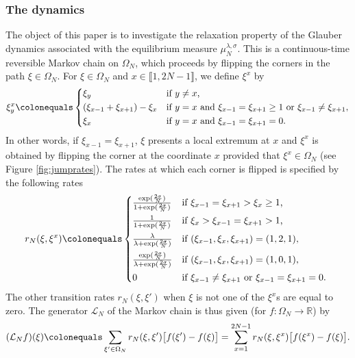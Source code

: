 \documentclass[reqno,11pt]{amsart}
\numberwithin{equation}{section}
\newcommand{\bbR}{{\ensuremath{\mathbb R}} }
\newcommand{\gO}{\Omega}
\newcommand{\lint}{\llbracket}
\newcommand{\rint}{\rrbracket}
\begin{document}
\subsubsection{The dynamics}
The object of this paper is to investigate the relaxation property of the Glauber dynamics associated with the equilibrium measure 
$\mu_N^{\lambda, \sigma}$. This is
a continuous-time reversible Markov chain on $\Omega_N$,   which proceeds by flipping the corners in the path
  $\xi \in \Omega_N$.
For $\xi \in \Omega_N$ and $x \in \lint 1, 2N-1\rint$,  we define $\xi^x$ by 
\begin{equation}\label{flippingcorner}
\xi^x_y\colonequals\begin{cases*}
\xi_y &if $y\neq x$,\\
(\xi_{x-1}+\xi_{x+1})-\xi_x & if $y=x \mbox{ and }  \xi_{x-1}=\xi_{x+1}\geq 1 \mbox{ or } \xi_{x-1}\neq \xi_{x+1}$,\\
\xi_x  & if  $y=x \mbox{ and } \xi_{x-1}=\xi_{x+1}=0$.
\end{cases*}
\end{equation}
In other words, if $\xi_{x-1}=\xi_{x+1}$, $\xi$ presents a local extremum at $x$ and $\xi^x$ is obtained by flipping the corner at the coordinate $x$ provided that $\xi^x\in \Omega_N$  (see Figure \ref {fig:jumprates}).
The rates at which each corner is flipped is specified by the following rates 
\begin{equation}\label{jumprate}
    r_N(\xi, \xi^x)\colonequals  \begin{cases*}
      \frac{\exp({\frac{2\sigma}{N}})}{1+\exp({\frac{2\sigma}{N}})}  & if $\xi_{x-1}=\xi_{x+1}>\xi_x\geq 1$, \\
       \frac{1}{1+\exp({\frac{2\sigma}{N}})}  & if $\xi_x>\xi_{x-1}=\xi_{x+1}> 1$, \\
       \frac{\lambda}{\lambda+\exp({\frac{2\sigma}{N}})}        &  if $(\xi_{x-1}, \xi_x, \xi_{x+1})=(1, 2, 1) $,\\
       \frac{\exp({\frac{2\sigma}{N}})}{\lambda+\exp({\frac{2\sigma}{N}})}        &  if $(\xi_{x-1}, \xi_x, \xi_{x+1})=(1, 0, 1) $,\\
       0 & if $\xi_{x-1}\neq \xi_{x+1}$ or $\xi_{x-1}=\xi_{x+1}=0$.
    \end{cases*}
\end{equation}
 The other transition rates $r_N(\xi,\xi')$ when $\xi$ is not one of the $\xi^x$s are equal to zero.
The generator $\mathcal{L}_N$ of the Markov chain is thus given
(for $f: \Omega_N \to \bbR $) by
\begin{equation}
(\mathcal{L}_N f)(\xi) \colonequals \sum_{\xi'\in \gO_N} r_N(\xi,\xi') \big[f(\xi') -f(\xi) \big]=  \sum_{x=1}^{2N-1} r_N(\xi, \xi^x) \big[f(\xi^x) -f(\xi) \big].  \label{generator}
\end{equation}
\end{document}
